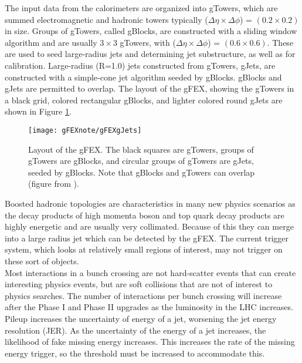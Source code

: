 The input data from the calorimeters are organized into gTowers, which are summed electromagnetic and hadronic towers typically ($\Delta \eta \times \Delta \phi $) = $(0.2 \times 0.2)$ in size.  Groups of gTowers, called gBlocks, are constructed with a sliding window algorithm and are usually $3 \times 3$ gTowers, with ($\Delta \eta \times \Delta \phi $) = $(0.6 \times 0.6)$.  These are used to seed large-radius jets and determining jet substructure, as well as for calibration.  Large-radius (R=1.0) jets constructed from gTowers, gJets, are constructed with a simple-cone jet algorithm seeded by gBlocks. gBlocks and gJets are permitted to overlap.  The layout of the gFEX, showing the gTowers in a black grid, colored rectangular gBlocks, and lighter colored round gJets are shown in Figure \ref{fig:gtowerslayout}.\\

\begin{figure} [h!]
\centering
\texttt{[image: gFEXnote/gFEXgJets]} %
\caption[Layout of the gFEX]{\label{fig:gtowerslayout}{Layout of the gFEX.  The black squares are gTowers, groups of gTowers are gBlocks, and circular groups of gTowers are gJets, seeded by gBlocks.  Note that gBlocks and gTowers can overlap (figure from \cite{gFEXFDR}).}}
\end{figure}

Boosted hadronic topologies are characteristics in many new physics scenarios as the decay products of high momenta boson and top quark decay products are highly energetic and are usually very collimated.  Because of this they can merge into a large radius jet which can be detected by the gFEX.  The current trigger system, which looks at relatively small regions of interest, may not trigger on these sort of objects. \\

Most interactions in a bunch crossing are not hard-scatter events that can create interesting physics events, but are soft collisions that are not of interest to physics searches.  The number of interactions per bunch crossing will increase after the Phase I and Phase II upgrades as the luminosity in the LHC increases.  Pileup increases the uncertainty of energy of a jet, worsening the jet energy resolution (JER).  As the uncertainty of the energy of a jet increases, the likelihood of fake missing energy increases.  This increases the rate of the missing energy trigger, so the threshold must be increased to accommodate this. \\

